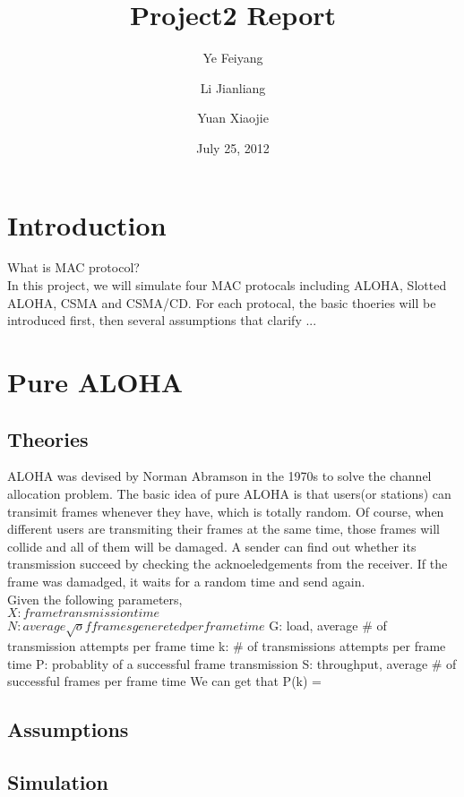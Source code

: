 \documentclass[11pt,oneside,a4paper]{report}
\begin{document}
\title{Project2 Report}
\author{Ye Feiyang \and Li Jianliang \and Yuan Xiaojie}
\date{July 25, 2012}
\maketitle

\section*{Introduction}
What is MAC protocol?\\
In this project, we will simulate four MAC protocals including ALOHA, Slotted ALOHA, CSMA and CSMA/CD. For each protocal, the basic thoeries will be introduced first, then several assumptions that clarify ...

\section*{Pure ALOHA}
\subsection*{Theories}
ALOHA was devised by Norman Abramson in the 1970s to solve the channel allocation problem. The basic idea of pure ALOHA is that users(or stations) can transimit frames whenever they have, which is totally random. Of course, when different users are transmiting their frames at the same time, those frames will collide and all of them will be damaged. A sender can find out whether its transmission succeed by checking the acknoeledgements from the receiver. If the frame was damadged, it waits for a random time and send again.\\

Given the following parameters,\\
	\(X: frame transmission time\)\\
	\(N: average \surd of frames genereted per frame time\)
	G: load, average # of transmission attempts per frame time
	k: # of transmissions attempts per frame time
	P: probablity of a successful frame transmission
	S: throughput, average # of successful frames per frame time
We can get that
	P(k) = 

\subsection*{Assumptions}

\subsection*{Simulation}
\end{document}
